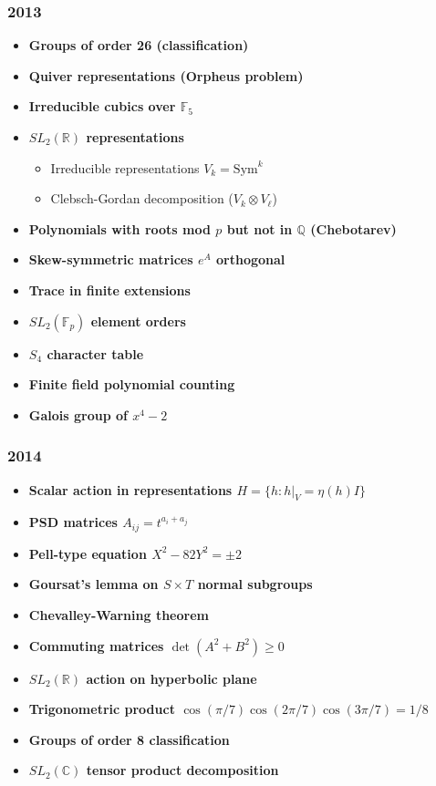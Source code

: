 \subsubsection*{2013}
\begin{itemize}
    \item \textbf{Groups of order 26 (classification)}
    \item \textbf{Quiver representations (Orpheus problem)}
    \item \textbf{Irreducible cubics over $\mathbb{F}_5$}
    \item \textbf{$SL_2(\mathbb{R})$ representations}
        \begin{itemize}
            \item Irreducible representations $V_k = \mathrm{Sym}^k$
            \item Clebsch-Gordan decomposition ($V_k \otimes V_\ell$)
        \end{itemize}
    \item \textbf{Polynomials with roots mod $p$ but not in $\mathbb{Q}$ (Chebotarev)}
    \item \textbf{Skew-symmetric matrices $e^A$ orthogonal}
    \item \textbf{Trace in finite extensions}
    \item \textbf{$SL_2(\mathbb{F}_p)$ element orders}
    \item \textbf{$S_4$ character table}
    \item \textbf{Finite field polynomial counting}
    \item \textbf{Galois group of $x^4-2$}
\end{itemize}

\subsubsection*{2014}
\begin{itemize}
    \item \textbf{Scalar action in representations $H = \{h : h|_V = \eta(h)I\}$}
    \item \textbf{PSD matrices $A_{ij} = t^{a_i+a_j}$}
    \item \textbf{Pell-type equation $X^2-82Y^2=\pm2$}
    \item \textbf{Goursat's lemma on $S \times T$ normal subgroups}
    \item \textbf{Chevalley-Warning theorem}
    \item \textbf{Commuting matrices $\det(A^2+B^2) \geq 0$}
    \item \textbf{$SL_2(\mathbb{R})$ action on hyperbolic plane}
    \item \textbf{Trigonometric product $\cos(\pi/7)\cos(2\pi/7)\cos(3\pi/7)=1/8$}
    \item \textbf{Groups of order 8 classification}
    \item \textbf{$SL_2(\mathbb{C})$ tensor product decomposition}
\end{itemize}

